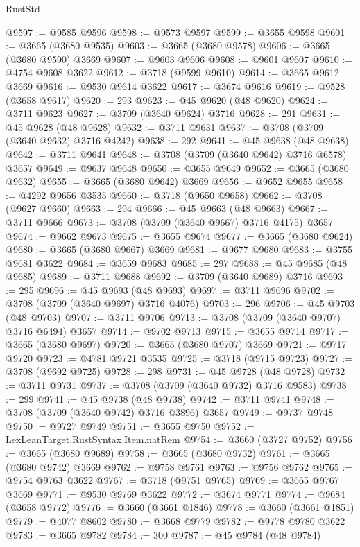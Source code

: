 \begin{lexlean}{RustStd}
\begin{coremodule}
@9597 := @9585 @9596
@9598 := @9573 @9597
@9599 := @3655 @9598
@9601 := @3665 (@3680 @9535)
@9603 := @3665 (@3680 @9578)
@9606 := @3665 (@3680 @9590) @3669
@9607 := @9603 @9606
@9608 := @9601 @9607
@9610 := @4754 @9608 @3622
@9612 := @3718 (@9599 @9610)
@9614 := @3665 @9612 @3669
@9616 := @9530 @9614 @3622
@9617 := @3674 @9616
@9619 := @9528 (@3658 @9617)
@9620 := 293
@9623 := @45 @9620 (@48 @9620)
@9624 := @3711 @9623
@9627 := @3709 (@3640 @9624) @3716
@9628 := 291
@9631 := @45 @9628 (@48 @9628)
@9632 := @3711 @9631
@9637 := @3708 (@3709 (@3640 @9632) @3716 @4242)
@9638 := 292
@9641 := @45 @9638 (@48 @9638)
@9642 := @3711 @9641
@9648 := @3708 (@3709 (@3640 @9642) @3716 @6578) @3657
@9649 := @9637 @9648
@9650 := @3655 @9649
@9652 := @3665 (@3680 @9632)
@9655 := @3665 (@3680 @9642) @3669
@9656 := @9652 @9655
@9658 := @4292 @9656 @3535
@9660 := @3718 (@9650 @9658)
@9662 := @3708 (@9627 @9660)
@9663 := 294
@9666 := @45 @9663 (@48 @9663)
@9667 := @3711 @9666
@9673 := @3708 (@3709 (@3640 @9667) @3716 @4175) @3657
@9674 := @9662 @9673
@9675 := @3655 @9674
@9677 := @3665 (@3680 @9624)
@9680 := @3665 (@3680 @9667) @3669
@9681 := @9677 @9680
@9683 := @3755 @9681 @3622
@9684 := @3659 @9683
@9685 := 297
@9688 := @45 @9685 (@48 @9685)
@9689 := @3711 @9688
@9692 := @3709 (@3640 @9689) @3716
@9693 := 295
@9696 := @45 @9693 (@48 @9693)
@9697 := @3711 @9696
@9702 := @3708 (@3709 (@3640 @9697) @3716 @4076)
@9703 := 296
@9706 := @45 @9703 (@48 @9703)
@9707 := @3711 @9706
@9713 := @3708 (@3709 (@3640 @9707) @3716 @6494) @3657
@9714 := @9702 @9713
@9715 := @3655 @9714
@9717 := @3665 (@3680 @9697)
@9720 := @3665 (@3680 @9707) @3669
@9721 := @9717 @9720
@9723 := @4781 @9721 @3535
@9725 := @3718 (@9715 @9723)
@9727 := @3708 (@9692 @9725)
@9728 := 298
@9731 := @45 @9728 (@48 @9728)
@9732 := @3711 @9731
@9737 := @3708 (@3709 (@3640 @9732) @3716 @9583)
@9738 := 299
@9741 := @45 @9738 (@48 @9738)
@9742 := @3711 @9741
@9748 := @3708 (@3709 (@3640 @9742) @3716 @3896) @3657
@9749 := @9737 @9748
@9750 := @9727 @9749
@9751 := @3655 @9750
@9752 := LexLeanTarget.RustSyntax.Item.natRem
@9754 := @3660 (@3727 @9752)
@9756 := @3665 (@3680 @9689)
@9758 := @3665 (@3680 @9732)
@9761 := @3665 (@3680 @9742) @3669
@9762 := @9758 @9761
@9763 := @9756 @9762
@9765 := @9754 @9763 @3622
@9767 := @3718 (@9751 @9765)
@9769 := @3665 @9767 @3669
@9771 := @9530 @9769 @3622
@9772 := @3674 @9771
@9774 := @9684 (@3658 @9772)
@9776 := @3660 (@3661 @1846)
@9778 := @3660 (@3661 @1851)
@9779 := @4077 @8602
@9780 := @3668 @9779
@9782 := @9778 @9780 @3622
@9783 := @3665 @9782
@9784 := 300
@9787 := @45 @9784 (@48 @9784)

\end{coremodule}
\end{lexlean}
